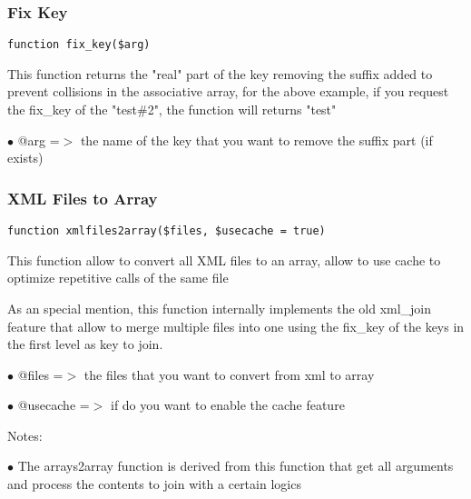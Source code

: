 \documentclass[a4paper]{article}
\begin{document}
\hypertarget{toc276}{}
\subsubsection{Fix Key}

\begin{lstlisting}
function fix_key($arg)
\end{lstlisting}

This function returns the "real" part of the key removing the suffix added to
prevent collisions in the associative array, for the above example, if you request
the fix\_key of the "test\#2", the function will returns "test"

\begin{compactitem}
\item[\color{myblue}$\bullet$] @arg =$>$ the name of the key that you want to remove the suffix part (if exists)
\end{compactitem}

\hypertarget{toc277}{}
\subsubsection{XML Files to Array}

\begin{lstlisting}
function xmlfiles2array($files, $usecache = true)
\end{lstlisting}

This function allow to convert all XML files to an array, allow to use cache to
optimize repetitive calls of the same file

As an special mention, this function internally implements the old xml\_join feature
that allow to merge multiple files into one using the fix\_key of the keys in the first
level as key to join.

\begin{compactitem}
\item[\color{myblue}$\bullet$] @files    =$>$ the files that you want to convert from xml to array
\item[\color{myblue}$\bullet$] @usecache =$>$ if do you want to enable the cache feature
\end{compactitem}

Notes:

\begin{compactitem}
\item[\color{myblue}$\bullet$] The arrays2array function is derived from this function that get all arguments and
  process the contents to join with a certain logics
\end{compactitem}
\end{document}

